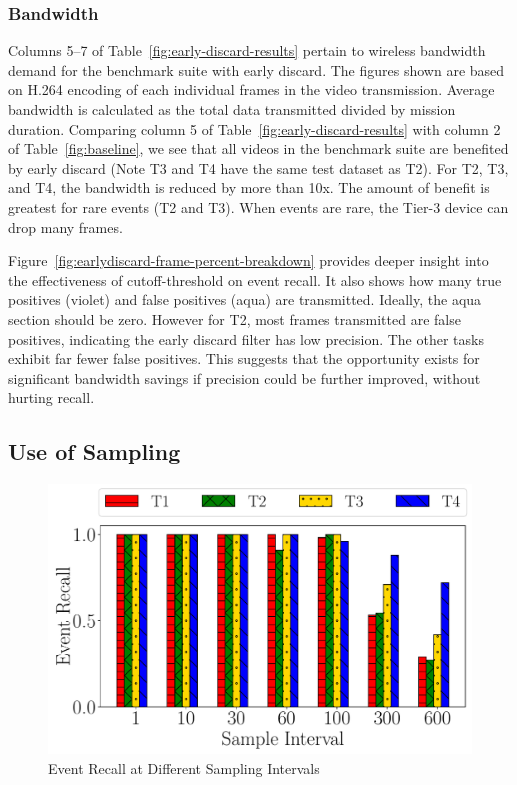 \subsubsection{Bandwidth}
Columns 5--7 of Table~\ref{fig:early-discard-results} pertain to wireless
bandwidth demand for the benchmark suite with early discard.  The figures shown
are based on H.264 encoding of each individual frames in the video transmission.
Average bandwidth is calculated as the total data transmitted divided by mission
duration.  Comparing column 5 of Table~\ref{fig:early-discard-results} with
column 2 of Table~\ref{fig:baseline}, we see that all videos in the benchmark
suite are benefited by early discard (Note T3 and T4 have the same test dataset
as T2). For T2, T3, and T4, the bandwidth is reduced by more than 10x. The
amount of benefit is greatest for rare events (T2 and T3).  When events are
rare, the Tier-3 device can drop many frames.

Figure~\ref{fig:earlydiscard-frame-percent-breakdown} provides deeper insight
into the effectiveness of cutoff-threshold on event recall. It also shows how
many true positives (violet) and false positives (aqua) are
transmitted. Ideally, the aqua section should be zero.  However for T2, most
frames transmitted are false positives, indicating the early discard filter has
low precision.  The other tasks exhibit far fewer false positives.  This
suggests that the opportunity exists for significant bandwidth savings if
precision could be further improved, without hurting recall.

\subsection{Use of Sampling}

\begin{figure}
    \centering
    \includegraphics[width=.7\linewidth]{FIGS/fig-random-select-interval-recall-hatch.pdf}
    \caption{Event Recall at Different Sampling Intervals}
    \label{fig:sampling-only}
\end{figure}


